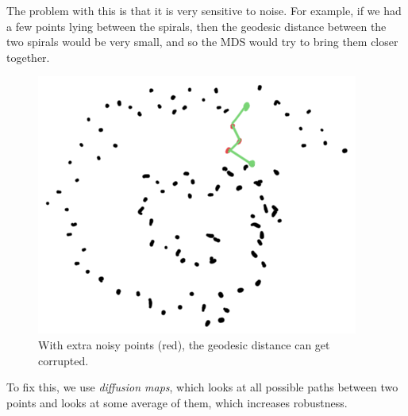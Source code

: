  The problem with this is that it is very sensitive to noise. For example, if we had a few points lying between the spirals, then the geodesic distance between the two spirals would be very small, and so the MDS would try to bring them closer together.  

  \begin{figure}[H]
    \centering 
    \includegraphics[scale=0.4]{img/isomap_problem.png}
    \caption{With extra noisy points (red), the geodesic distance can get corrupted.} 
    \label{fig:isomap_problem}
  \end{figure}

  To fix this, we use \textit{diffusion maps}, which looks at all possible paths between two points and looks at some average of them, which increases robustness. 

